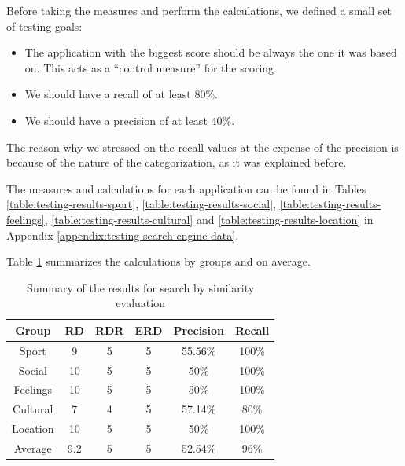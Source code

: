 Before taking the measures and perform the calculations, we defined a small set
of testing goals:
\begin{itemize}
  \item The application with the biggest score should be always the one it was
  based on. This acts as a ``control measure'' for the scoring.
  \item We should have a recall of at least 80\%.
  \item We should have a precision of at least 40\%.
\end{itemize}

The reason why we stressed on the recall values at the expense of the
precision is because of the nature of the categorization, as it was explained
before.

The measures and calculations for each application can be found in Tables
\ref{table:testing-results-sport}, \ref{table:testing-results-social},
\ref{table:testing-results-feelings}, \ref{table:testing-results-cultural} and
\ref{table:testing-results-location} in Appendix \ref{appendix:testing-search-engine-data}.

Table \ref{table:testing-summary} summarizes the calculations by groups and on
average.

\begin{table}[h!]
	\small
    \begin{center}
		\begin{tabular}{||c|c|c|c|c|c||}

		\hline \hline
			Group & RD & RDR & ERD & Precision & Recall \\
		\hline \hline
			Sport & 9 & 5 & 5 & 55.56\% & 100\%\\
			\hline
			Social & 10 & 5 & 5 & 50\% & 100\%\\
			\hline
			Feelings & 10 & 5 & 5 & 50\% & 100\%\\
			\hline
			Cultural & 7 & 4 & 5 & 57.14\% & 80\%\\
			\hline
			Location & 10 & 5 & 5 & 50\% & 100\%\\
			\hline
			\hline
			Average & 9.2 & 5 & 5 & 52.54\% & 96\%\\

		\hline \hline

		\end{tabular}
		\caption{\label{table:testing-summary} Summary of the results for search by
		similarity evaluation}
	\end{center}
\end{table}

